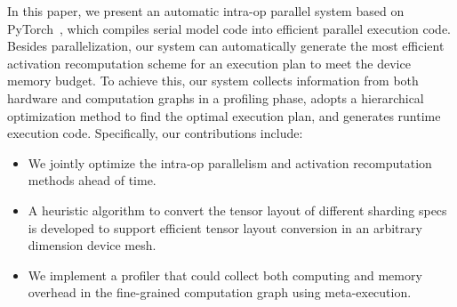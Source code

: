 In this paper, we present an automatic intra-op parallel system based on PyTorch~\cite{paszke2019pytorch}, which compiles serial model code into efficient parallel execution code. Besides parallelization, our system can automatically generate the most efficient activation recomputation scheme for an execution plan to meet the device memory budget. To achieve this, our system collects information from both hardware and  computation graphs in a profiling phase, adopts a hierarchical optimization method to find the optimal execution plan, and generates runtime execution code. Specifically, our contributions include:

\begin{itemize}
    \item We jointly optimize the intra-op parallelism and activation recomputation methods ahead of time. 
    \item A heuristic algorithm to convert the tensor layout of different sharding specs is developed to support efficient tensor layout conversion in an arbitrary dimension device mesh.
    \item We implement a profiler that could collect both computing and memory overhead in the fine-grained computation graph using meta-execution.
\end{itemize}